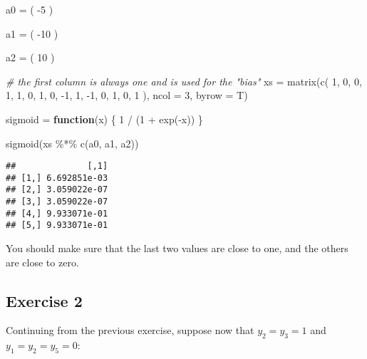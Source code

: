 \documentclass[
]{article}
\newenvironment{Shaded}{\begin{snugshade}}{\end{snugshade}}
\newcommand{\AttributeTok}[1]{\textcolor[rgb]{0.77,0.63,0.00}{#1}}
\newcommand{\CommentTok}[1]{\textcolor[rgb]{0.56,0.35,0.01}{\textit{#1}}}
\newcommand{\ControlFlowTok}[1]{\textcolor[rgb]{0.13,0.29,0.53}{\textbf{#1}}}
\newcommand{\DecValTok}[1]{\textcolor[rgb]{0.00,0.00,0.81}{#1}}
\newcommand{\FunctionTok}[1]{\textcolor[rgb]{0.00,0.00,0.00}{#1}}
\newcommand{\NormalTok}[1]{#1}
\newcommand{\OtherTok}[1]{\textcolor[rgb]{0.56,0.35,0.01}{#1}}
\newcommand{\SpecialCharTok}[1]{\textcolor[rgb]{0.00,0.00,0.00}{#1}}
\begin{document}
\begin{Shaded}
\begin{Highlighting}[]
\NormalTok{a0 }\OtherTok{=}\NormalTok{ (}
  \SpecialCharTok{{-}}\DecValTok{5}
\NormalTok{)}

\NormalTok{a1 }\OtherTok{=}\NormalTok{ (}
  \SpecialCharTok{{-}}\DecValTok{10}
\NormalTok{)}

\NormalTok{a2 }\OtherTok{=}\NormalTok{ (}
  \DecValTok{10}
\NormalTok{)}

\CommentTok{\# the first column is always one and is used for the "bias"}
\NormalTok{xs }\OtherTok{=} \FunctionTok{matrix}\NormalTok{(}\FunctionTok{c}\NormalTok{(}
  \DecValTok{1}\NormalTok{, }\DecValTok{0}\NormalTok{, }\DecValTok{0}\NormalTok{,}
  \DecValTok{1}\NormalTok{, }\DecValTok{1}\NormalTok{, }\DecValTok{0}\NormalTok{,}
  \DecValTok{1}\NormalTok{, }\DecValTok{0}\NormalTok{, }\SpecialCharTok{{-}}\DecValTok{1}\NormalTok{,}
  \DecValTok{1}\NormalTok{, }\SpecialCharTok{{-}}\DecValTok{1}\NormalTok{, }\DecValTok{0}\NormalTok{,}
  \DecValTok{1}\NormalTok{, }\DecValTok{0}\NormalTok{, }\DecValTok{1}
\NormalTok{), }\AttributeTok{ncol =} \DecValTok{3}\NormalTok{, }\AttributeTok{byrow =}\NormalTok{ T)}

\NormalTok{sigmoid }\OtherTok{=} \ControlFlowTok{function}\NormalTok{(x) \{}
  \DecValTok{1} \SpecialCharTok{/}\NormalTok{ (}\DecValTok{1} \SpecialCharTok{+} \FunctionTok{exp}\NormalTok{(}\SpecialCharTok{{-}}\NormalTok{x))}
\NormalTok{\}}

\FunctionTok{sigmoid}\NormalTok{(xs }\SpecialCharTok{\%*\%} \FunctionTok{c}\NormalTok{(a0, a1, a2))}
\end{Highlighting}
\end{Shaded}

\begin{verbatim}
##              [,1]
## [1,] 6.692851e-03
## [2,] 3.059022e-07
## [3,] 3.059022e-07
## [4,] 9.933071e-01
## [5,] 9.933071e-01
\end{verbatim}

You should make sure that the last two values are close to one, and the
others are close to zero.

\hypertarget{exercise-2}{%
\subsection{Exercise 2}\label{exercise-2}}

Continuing from the previous exercise, suppose now that \(y_2=y_3=1\)
and \(y_1=y_2=y_5=0\):
\end{document}
